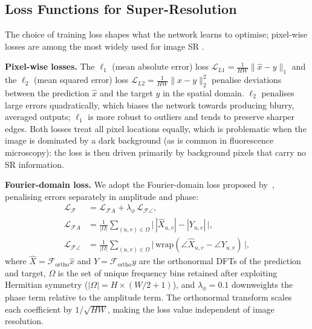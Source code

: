 \subsection{Loss Functions for Super-Resolution}
\label{subsec:loss_functions}

The choice of training loss shapes what the network learns to optimise; pixel-wise losses are among the most widely used for image SR \cite{DLforSR2019}.

\textbf{Pixel-wise losses.} The $\ell_1$ (mean absolute error) loss 
$\mathcal{L}_{L1} = \frac{1}{HW}\|\hat{x} - y\|_1$ and the $\ell_2$ 
(mean squared error) loss 
$\mathcal{L}_{L2} = \frac{1}{HW}\|\hat{x} - y\|_2^2$ penalise deviations 
between the prediction $\hat{x}$ and the target $y$ in the spatial domain. 
$\ell_2$ penalises large errors quadratically, 
which biases the network towards producing blurry, averaged outputs; 
$\ell_1$ is more robust to outliers and tends to preserve sharper edges. 
Both losses treat all pixel locations equally, 
which is problematic when the image is dominated by a dark background (as is common in fluorescence microscopy): 
the loss is then driven primarily by background pixels that carry no SR information.

\textbf{Fourier-domain loss.}
We adopt the Fourier-domain loss proposed by~\cite{fuoli2021fourierspacelossesefficient},
penalising errors separately in amplitude and phase:
\begin{align}
  \mathcal{L}_{\mathcal{F}} &= \mathcal{L}_{\mathcal{F}A} + \lambda_\phi\,\mathcal{L}_{\mathcal{F}\angle},
  \label{eq:fourier_loss} \\
  \mathcal{L}_{\mathcal{F}A} &= \frac{1}{|\Omega|}
    \sum_{(u,v)\in\Omega}
    \bigl|\,|\hat{X}_{u,v}| - |Y_{u,v}|\,\bigr|,
  \label{eq:fourier_amp} \\
  \mathcal{L}_{\mathcal{F}\angle} &= \frac{1}{|\Omega|}
    \sum_{(u,v)\in\Omega}
    \bigl|\,\mathrm{wrap}(\angle\hat{X}_{u,v} - \angle Y_{u,v})\,\bigr|,
  \label{eq:fourier_phase}
\end{align}
where $\hat{X} = \mathcal{F}_\mathrm{ortho}\hat{x}$ and $Y = \mathcal{F}_\mathrm{ortho}y$
are the orthonormal DFTs of the prediction and target, $\Omega$ is the set of unique
frequency bins retained after exploiting Hermitian symmetry
($|\Omega| = H \times (W/2 + 1)$), and $\lambda_\phi = 0.1$ downweights the phase
term relative to the amplitude term.
The orthonormal transform scales each coefficient by $1/\sqrt{HW}$, making the loss
value independent of image resolution.

